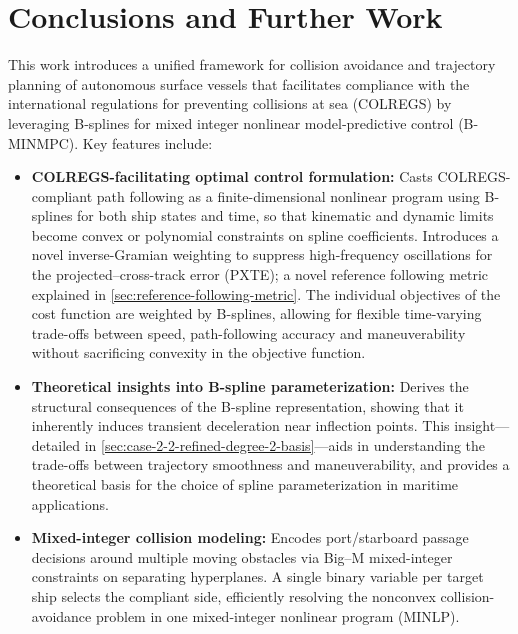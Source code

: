
\chapter{Conclusions and Further Work}
\label{chap:conclusions}

This work introduces a unified framework for collision avoidance and trajectory planning of autonomous surface vessels that facilitates compliance with the international regulations for preventing collisions at sea (COLREGS) by leveraging B‐splines for mixed integer nonlinear model‐predictive control (B-MINMPC).  Key features include:

\begin{itemize}
    \item \textbf{COLREGS-facilitating optimal control formulation:}  Casts COLREGS-compliant path following as a finite-dimensional nonlinear program using B-splines for both ship states and time, so that kinematic and dynamic limits become convex or polynomial constraints on spline coefficients. Introduces a novel inverse-Gramian weighting to suppress high-frequency oscillations for the projected–cross-track error (PXTE); a novel reference following metric explained in \cref{sec:reference-following-metric}. The individual objectives of the cost function are weighted by B-splines, allowing for flexible time-varying trade-offs between speed, path-following accuracy and maneuverability without sacrificing convexity in the objective function.
    
    \item \textbf{Theoretical insights into B-spline parameterization:}  Derives the structural consequences of the B-spline representation, showing that it inherently induces transient deceleration near inflection points. This insight---detailed in \cref{sec:case-2-2-refined-degree-2-basis}---aids in understanding the trade-offs between trajectory smoothness and maneuverability, and provides a theoretical basis for the choice of spline parameterization in maritime applications.

    \item \textbf{Mixed-integer collision modeling:}  Encodes port/starboard passage decisions around multiple moving obstacles via Big–M mixed-integer constraints on separating hyperplanes. A single binary variable per target ship selects the compliant side, efficiently resolving the nonconvex collision-avoidance problem in one mixed-integer nonlinear program (MINLP).


\end{itemize}
